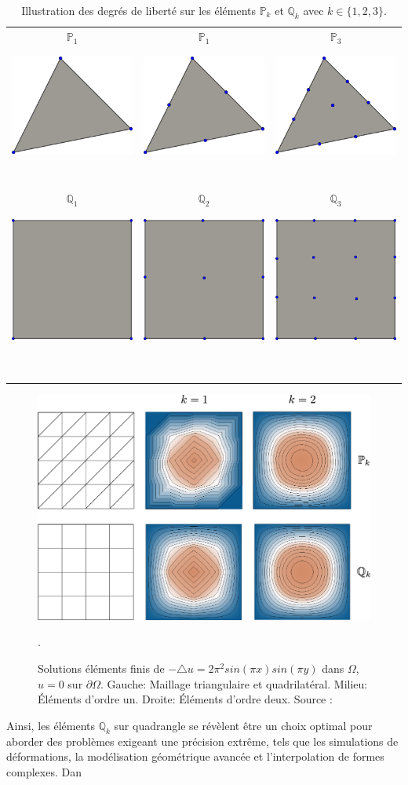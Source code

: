 \begin{table}[!h]
\centering
\begin{tabular}{|c|c|c|}
\hline
\multirow{2}{*}{$\mathbb{P}_1$} & \multirow{2}{*}{$\mathbb{P}_1$} & \multirow{2}{*}{$\mathbb{P}_3$} \\
&&\\
\hline
&&\\
&&\\
\multirow{2}{*}{\includegraphics[scale=0.25]{images/P1.pdf}}   & \multirow{2}{*}{\includegraphics[scale=0.25]{images/P2.pdf}}   & \multirow{2}{*}{\includegraphics[scale=0.25]{images/P3.pdf}}   \\
&                          &                            \\
&&\\
&&\\
&&\\
&&\\
&&\\
&&\\
&&\\
\hline
\multirow{2}{*}{$\mathbb{Q}_1$} & \multirow{2}{*}{$\mathbb{Q}_2$}   & \multirow{2}{*}{$\mathbb{Q}_3$} \\
&&\\
\hline
&&\\
&&\\
\multirow{2}{*}{\includegraphics[scale=0.2]{images/Q1.pdf}}   & \multirow{2}{*}{\includegraphics[scale=0.2]{images/Q2.pdf}}   & \multirow{2}{*}{\includegraphics[scale=0.2]{images/Q3.pdf}}   \\
&&\\
&&\\
&&\\
&&\\
&&\\
&&\\
&&\\
&&\\
&&\\
&&\\
\hline
\end{tabular}
\caption{Illustration des degrés de liberté sur les éléments $\mathbb{P}_k$ et $\mathbb{Q}_k$ avec $k\in\{1,2, 3\}$.}
\label{tab:p1_vs_p2}
\end{table}

\begin{figure}[!h]
    \centering
    \includegraphics[scale=0.5]{images/comparaison_P_1_P_2.png}
    \caption{Solutions éléments finis de $-\triangle u=2\pi^2sin(\pi x)sin(\pi y)$ dans $\Omega$, $u=0$ sur $\partial\Omega$. Gauche: Maillage triangulaire et quadrilatéral. Milieu: Éléments d’ordre un. Droite: Éléments d’ordre deux. Source : \cite{reberol2018maillages}}.
    \label{fig:p1_vs_p2}
\end{figure}

Ainsi, les éléments $\mathbb{Q}_k$ sur quadrangle se révèlent être un choix optimal pour aborder des problèmes exigeant une précision extrême, tels que les simulations de déformations, la modélisation géométrique avancée et l'interpolation de formes complexes. Dan